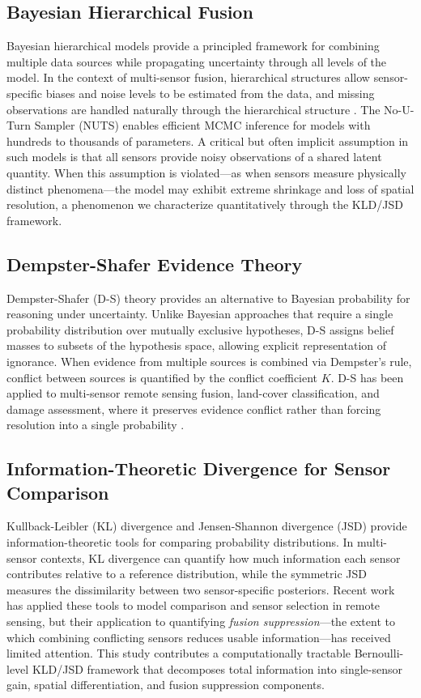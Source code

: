 \documentclass[wcp]{jmlr}
\begin{document}
\subsection{Bayesian Hierarchical Fusion}

Bayesian hierarchical models provide a principled framework for combining
multiple data sources while propagating uncertainty through all levels of
the model. In the context of multi-sensor fusion, hierarchical structures
allow sensor-specific biases and noise levels to be estimated from the
data, and missing observations are handled naturally through the
hierarchical structure \cite{gelman2006}. The No-U-Turn Sampler (NUTS)
\cite{hoffman2014} enables efficient MCMC inference for models with
hundreds to thousands of parameters. A critical but often implicit
assumption in such models is that all sensors provide noisy observations of
a shared latent quantity. When this assumption is violated---as when
sensors measure physically distinct phenomena---the model may exhibit
extreme shrinkage and loss of spatial resolution, a phenomenon we
characterize quantitatively through the KLD/JSD framework.

\subsection{Dempster-Shafer Evidence Theory}

Dempster-Shafer (D-S) theory \cite{dempster1967,shafer1976} provides an
alternative to Bayesian probability for reasoning under uncertainty. Unlike
Bayesian approaches that require a single probability distribution over
mutually exclusive hypotheses, D-S assigns belief masses to subsets of the
hypothesis space, allowing explicit representation of ignorance. When
evidence from multiple sources is combined via Dempster's rule, conflict
between sources is quantified by the conflict coefficient $K$. D-S has been
applied to multi-sensor remote sensing fusion, land-cover classification,
and damage assessment, where it preserves evidence conflict rather than
forcing resolution into a single probability \cite{lebedev2022}.

\subsection{Information-Theoretic Divergence for Sensor Comparison}

Kullback-Leibler (KL) divergence \cite{kullback1951} and Jensen-Shannon
divergence (JSD) \cite{lin1991} provide information-theoretic tools for
comparing probability distributions. In multi-sensor contexts, KL
divergence can quantify how much information each sensor contributes
relative to a reference distribution, while the symmetric JSD measures the
dissimilarity between two sensor-specific posteriors. Recent work has
applied these tools to model comparison and sensor selection in remote
sensing, but their application to quantifying \emph{fusion suppression}---the
extent to which combining conflicting sensors reduces usable
information---has received limited attention. This study contributes a
computationally tractable Bernoulli-level KLD/JSD framework that decomposes
total information into single-sensor gain, spatial differentiation, and
fusion suppression components.
\end{document}
